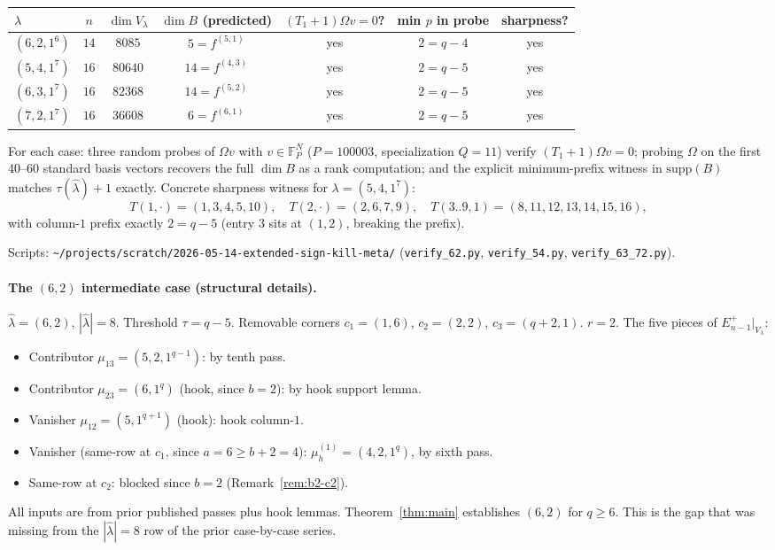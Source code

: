 \documentclass[11pt]{article}
\theoremstyle{definition}
\newcommand{\Vlam}{V_\lambda}
\newcommand{\Om}{\Omega}
\newcommand{\hatl}{\widehat\lambda}
\newcommand{\supp}{\mathrm{supp}}
\begin{document}
\begin{center}
\renewcommand{\arraystretch}{1.18}
\begin{tabular}{l|c|c|c|c|c|c}
\toprule
$\lambda$ & $n$ & $\dim \Vlam$ & $\dim B$ (predicted) &
$(T_1{+}1)\Om v = 0$? & min $p$ in probe & sharpness? \\
\midrule
$(6, 2, 1^6)$ & $14$ & $8085$  & $5 = f^{(5,1)}$ & yes & $2 = q-4$ & yes \\
$(5, 4, 1^7)$ & $16$ & $80640$ & $14 = f^{(4,3)}$ & yes & $2 = q-5$ & yes \\
$(6, 3, 1^7)$ & $16$ & $82368$ & $14 = f^{(5,2)}$ & yes & $2 = q-5$ & yes \\
$(7, 2, 1^7)$ & $16$ & $36608$ & $6 = f^{(6,1)}$ & yes & $2 = q-5$ & yes \\
\bottomrule
\end{tabular}
\end{center}

For each case: three random probes of $\Om v$ with $v \in
\mathbb{F}_P^N$ ($P = 100003$, specialization $Q = 11$) verify
$(T_1+1)\Om v = 0$; probing $\Om$ on the first 40--60 standard basis
vectors recovers the full $\dim B$ as a rank computation; and the
explicit minimum-prefix witness in $\supp(B)$ matches
$\tau(\hatl) + 1$ exactly.  Concrete sharpness witness for
$\lambda = (5, 4, 1^7)$:
\[
   T(1, \cdot) = (1, 3, 4, 5, 10),
   \quad T(2, \cdot) = (2, 6, 7, 9),
   \quad T(3..9, 1) = (8, 11, 12, 13, 14, 15, 16),
\]
with column-$1$ prefix exactly $2 = q - 5$ (entry $3$ sits at $(1, 2)$,
breaking the prefix).

Scripts:
\texttt{\textasciitilde/projects/scratch/2026-05-14-extended-sign-kill-meta/}
(\texttt{verify\_62.py}, \texttt{verify\_54.py}, \texttt{verify\_63\_72.py}).

\paragraph{The $(6, 2)$ intermediate case (structural details).}
$\hatl = (6, 2)$, $|\hatl| = 8$.  Threshold $\tau = q - 5$.  Removable
corners $c_1 = (1, 6)$, $c_2 = (2, 2)$, $c_3 = (q+2, 1)$.  $r = 2$.
The five pieces of $E^+_{n-1}|_{\Vlam}$:
\begin{itemize}[topsep=0.2em,itemsep=0.1em]
\item Contributor $\mu_{13} = (5, 2, 1^{q-1})$: by tenth pass.
\item Contributor $\mu_{23} = (6, 1^q)$ (hook, since $b = 2$): by hook
   support lemma.
\item Vanisher $\mu_{12} = (5, 1^{q+1})$ (hook): hook column-$1$.
\item Vanisher (same-row at $c_1$, since $a = 6 \ge b + 2 = 4$):
   $\mu_h^{(1)} = (4, 2, 1^q)$, by sixth pass.
\item Same-row at $c_2$: blocked since $b = 2$ (Remark~\ref{rem:b2-c2}).
\end{itemize}
All inputs are from prior published passes plus hook lemmas.
Theorem~\ref{thm:main} establishes $(6, 2)$ for $q \ge 6$.  This is
the gap that was missing from the $|\hatl| = 8$ row of the prior
case-by-case series.
\end{document}
